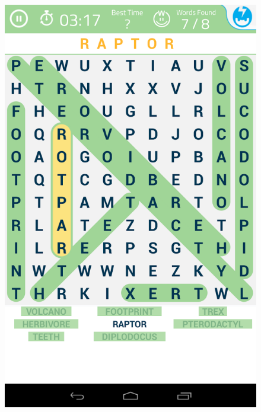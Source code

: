 \documentclass{beamer}
\begin{document}
\begin{frame}
\begin{columns}[c]
\begin{column}{5cm}
\begin{figure}
\includegraphics[scale=0.15]{word_puzzle.png}

\end{figure}
\end{column}
\end{columns}
\end{frame}
\end{document}
